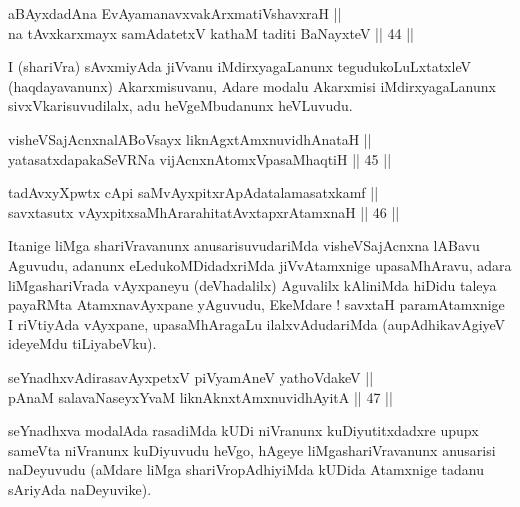 
\begin{shl}
aBAyxdadAna EvAyamanavxvakArxmatiVshavxraH || \\
na tAvxkarxmayx samAdatetxV kathaM taditi BaNayxteV \hfill || 44 ||  
\end{shl}

\begin{artha}
I (shariVra) sAvxmiyAda jiVvanu iMdirxyagaLanunx tegudukoLuLxtatxleV
(haqdayavanunx) Akarxmisuvanu, Adare modalu Akarxmisi iMdirxyagaLanunx
sivxVkarisuvudilalx, adu heVgeMbudanunx heVLuvudu.
\end{artha}


\begin{shl}
visheVSajAcnxnalABoV\s sayx liknAgxtAmxnuvidhAnataH || \\
yatasatxdapakaSeVRNa vijAcnxnAtomxVpasaMhaqtiH \hfill || 45 ||  
\end{shl}

\begin{shl}
tadAvxyXpwtx cApi saMvAyxpitxrApAdatalamasatxkamf || \\
savxtasutx vAyxpitxsaMhArarahitatAvxtapxrAtamxnaH \hfill || 46 ||  
\end{shl}

\begin{artha}
Itanige liMga shariVravanunx anusarisuvudariMda visheVSajAcnxna lABavu
Aguvudu, adanunx eLedukoMDidadxriMda jiVvAtamxnige upasaMhAravu, adara
liMgashariVrada vAyxpaneyu (deVhadalilx) Aguvalilx kAliniMda hiDidu
taleya payaRMta AtamxnavAyxpane yAguvudu, EkeMdare ! savxtaH
paramAtamxnige I riVtiyAda vAyxpane, upasaMhAragaLu ilalxvAdudariMda
(aupAdhikavAgiyeV ideyeMdu tiLiyabeVku).
\end{artha}


\begin{shl}
seYnadhxvAdirasavAyxpetxV piVyamAneV yathoVdakeV || \\
pAnaM salavaNaseyxYvaM liknAknxtAmxnuvidhAyitA \hfill || 47 ||  
\end{shl}

\begin{artha}
seYnadhxva modalAda rasadiMda kUDi niVranunx kuDiyutitxdadxre upupx
sameVta niVranunx kuDiyuvudu heVgo, hAgeye liMgashariVravanunx
anusarisi naDeyuvudu (aMdare liMga shariVropAdhiyiMda kUDida Atamxnige
tadanu sAriyAda naDeyuvike).
\end{artha}

